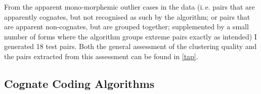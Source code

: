 \documentclass{scrartcl}
\begin{document}
From the apparent mono-morphemic outlier cases in the data (i.\,e. pairs that are apparently cognates, but not recognised as such by the algorithm; or pairs that are apparent non-cognates, but are grouped together; supplemented by a small number of forms where the algorithm groups extreme pairs exactly as intended) I generated 18 test pairs. Both the general assessment of the clustering quality and the pairs extracted from this assessment can be found in \cref{tap}.

\subsection{Cognate Coding Algorithms}
\end{document}
